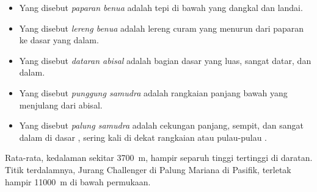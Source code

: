 \begin{definition}\label{def:g8:the-oceans:seafloor}
\begin{itemize}
  \item Yang disebut \emph{paparan benua} adalah tepi
         di bawah  yang dangkal dan landai.
  \item Yang disebut \emph{lereng benua} adalah lereng
        curam yang menurun dari paparan ke dasar  yang dalam.
  \item Yang disebut \emph{dataran abisal} adalah
        bagian dasar  yang luas, sangat datar, dan dalam.
  \item Yang disebut \emph{punggung samudra} adalah
        rangkaian panjang  bawah  yang menjulang dari 
        abisal.
  \item Yang disebut \emph{palung samudra} adalah
        cekungan panjang, sempit, dan sangat dalam di dasar ,
        sering kali di dekat rangkaian  atau pulau-pulau
        .
\end{itemize}
\end{definition}

Rata-rata, kedalaman  sekitar \qty{3700}{m}, hampir separuh tinggi
 tertinggi di daratan. Titik terdalamnya, Jurang Challenger di
Palung Mariana di  Pasifik, terletak hampir \qty{11000}{m} di
bawah permukaan.


